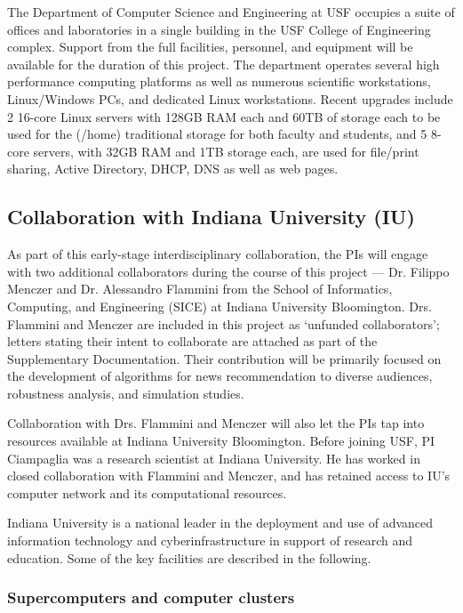 The Department of Computer Science and Engineering at USF occupies a suite of offices and laboratories in a single building in the USF College of Engineering complex. Support from the full facilities, personnel, and equipment will be available for the duration of this project. The department operates several high performance computing platforms as well as numerous scientific workstations, Linux/Windows PCs, and dedicated Linux workstations. Recent upgrades include 2 16-core Linux servers with 128GB RAM each and 60TB of storage each to be used for the (/home) traditional storage for both faculty and students, and 5 8-core servers, with 32GB RAM and 1TB storage each, are used for file/print sharing, Active Directory, DHCP, DNS as well as web pages. 

\subsection*{Collaboration with Indiana University (IU)}

As part of this early-stage interdisciplinary collaboration, the PIs will engage with two additional collaborators during the course of this project --- Dr. Filippo Menczer and Dr. Alessandro Flammini from the School of Informatics, Computing, and Engineering (SICE) at Indiana University Bloomington. Drs. Flammini and Menczer are included in this project as `unfunded collaborators'; letters stating their intent to collaborate are attached as part of the Supplementary Documentation. Their contribution will be primarily focused on the development of algorithms for news recommendation to diverse audiences, robustness analysis, and simulation studies.

Collaboration with Drs. Flammini and Menczer will also let the PIs tap into resources available at Indiana University Bloomington. Before joining USF, PI Ciampaglia was a research scientist at Indiana University. He has worked in closed collaboration with Flammini and Menczer, and has retained access to IU's computer network and its computational resources. 

Indiana University is a national leader in the deployment and use of advanced information technology and cyberinfrastructure in support of research and education. 
Some of the key facilities are described in the following.

\subsubsection*{Supercomputers and computer clusters} 

